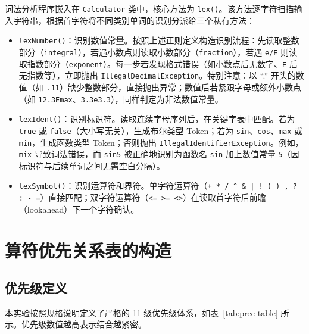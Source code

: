 词法分析程序嵌入在 \texttt{Calculator} 类中，核心方法为 \texttt{lex()}。该方法逐字符扫描输入字符串，根据首字符将不同类别单词的识别分派给三个私有方法：

\begin{itemize}
    \item \texttt{lexNumber()}：识别数值常量。按照上述正则定义构造识别流程：先读取整数部分（\texttt{integral}），若遇小数点则读取小数部分（\texttt{fraction}），若遇 \texttt{e/E} 则读取指数部分（\texttt{exponent}）。每一步若发现格式错误（如小数点后无数字、\texttt{E} 后无指数等），立即抛出 \texttt{IllegalDecimalException}。特别注意：以 ``.'' 开头的数值（如 \texttt{.11}）缺少整数部分，直接抛出异常；数值后若紧跟字母或额外小数点（如 \texttt{12.3Emax}、\texttt{3.3e3.3}），同样判定为非法数值常量。

    \item \texttt{lexIdent()}：识别标识符。读取连续字母序列后，在关键字表中匹配。若为 \texttt{true} 或 \texttt{false}（大小写无关），生成布尔类型 Token；若为 \texttt{sin}、\texttt{cos}、\texttt{max} 或 \texttt{min}，生成函数类型 Token；否则抛出 \texttt{IllegalIdentifierException}。例如，\texttt{mix} 导致词法错误，而 \texttt{sin5} 被正确地识别为函数名 \texttt{sin} 加上数值常量 \texttt{5}（因标识符与后续单词之间无需空白分隔）。

    \item \texttt{lexSymbol()}：识别运算符和界符。单字符运算符（\texttt{+ * / \^{} \& | ! ( ) , ? : - =}）直接匹配；双字符运算符（\texttt{<= >= <>}）在读取首字符后前瞻（lookahead）下一个字符确认。
\end{itemize}

\section{算符优先关系表的构造}

\subsection{优先级定义}

本实验按照规格说明定义了严格的 11 级优先级体系，如表~\ref{tab:prec-table} 所示。优先级数值越高表示结合越紧密。

